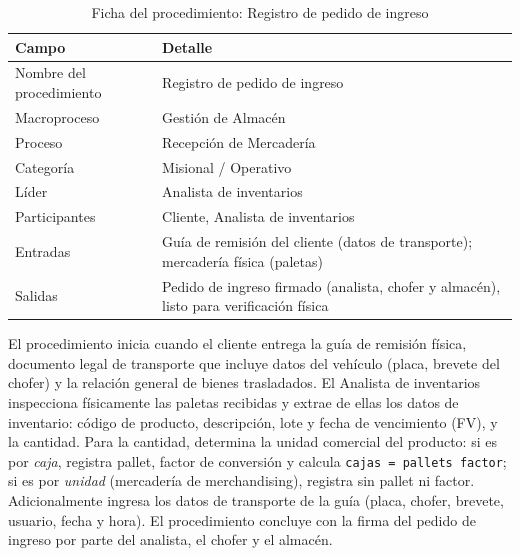 \documentclass[11pt, a4paper, oneside]{report}
\begin{document}
\begin{table}[H]
\centering\small
\renewcommand{\arraystretch}{1.25}
\setlength{\tabcolsep}{6pt}
\begin{tabularx}{\textwidth}{|>{\raggedright\arraybackslash}p{}|>{\raggedright\arraybackslash}X|}
\hline
\rowcolor{upeu_mid}
\color{white}\bfseries Campo & \color{white}\bfseries Detalle \\ \hline
\rowcolor{gray!10}
Nombre del procedimiento & Registro de pedido de ingreso \\ \hline
Macroproceso & Gestión de Almacén \\ \hline
\rowcolor{gray!10}
Proceso & Recepción de Mercadería \\ \hline
Categoría & Misional / Operativo \\ \hline
\rowcolor{gray!10}
Líder & Analista de inventarios \\ \hline
Participantes & Cliente, Analista de inventarios \\ \hline
\rowcolor{gray!10}
Entradas & Guía de remisión del cliente (datos de transporte); mercadería física (paletas) \\ \hline
\rowcolor{gray!10}
Salidas & Pedido de ingreso firmado (analista, chofer y almacén), listo para verificación física \\ \hline
\end{tabularx}
\caption{Ficha del procedimiento: Registro de pedido de ingreso}
\end{table}

El procedimiento inicia cuando el cliente entrega la guía de remisión física, documento legal de transporte que incluye datos del vehículo (placa, brevete del chofer) y la relación general de bienes trasladados. El Analista de inventarios inspecciona físicamente las paletas recibidas y extrae de ellas los datos de inventario: código de producto, descripción, lote y fecha de vencimiento (FV), y la cantidad. Para la cantidad, determina la unidad comercial del producto: si es por \textit{caja}, registra pallet, factor de conversión y calcula \texttt{cajas = pallets \texttimes{} factor}; si es por \textit{unidad} (mercadería de merchandising), registra sin pallet ni factor. Adicionalmente ingresa los datos de transporte de la guía (placa, chofer, brevete, usuario, fecha y hora). El procedimiento concluye con la firma del pedido de ingreso por parte del analista, el chofer y el almacén.
\end{document}

